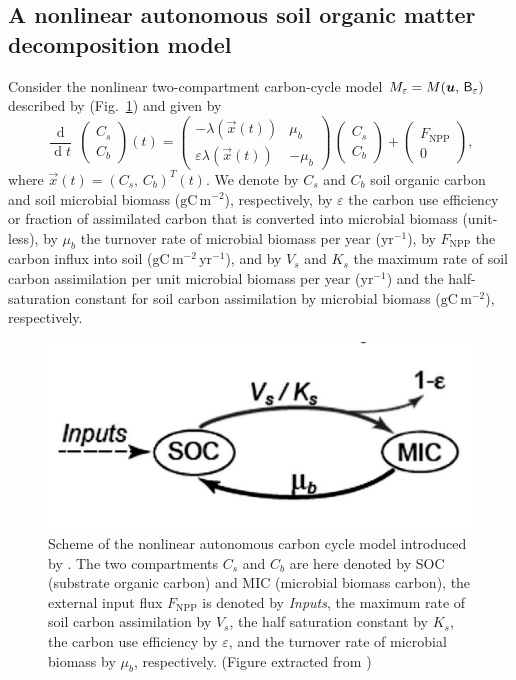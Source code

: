 \documentclass[smallextended]{svjour3}
\newcommand{\deriv}[1]{\frac{\operatorname{d}}{\operatorname{d}#1}}
\newcommand{\gC}{\mathrm{gC}}
\newcommand{\yr}{\mathrm{yr}}
\newcommand{\meter}{\mathrm{m}}
\newcommand{\transpose}{T}
\newcommand{\NPP}{\ensuremath{\mathrm{NPP}}}
\begin{document}
\subsection{A nonlinear autonomous soil organic matter decomposition model}
\label{sec:example_2}
Consider the nonlinear two-compartment carbon-cycle model $M_\varepsilon=M(\vec{u},\,\tens{B}_\varepsilon)$ described by \citet{Wang2014BG} (Fig.~\ref{fig:Wang_model}) and given by
\begin{equation*}
    \deriv{t}\,\begin{pmatrix}C_{s}\\C_{b}\end{pmatrix}(t) = 
    \begin{pmatrix}
      -\lambda(\vec{x}(t)) & \mu_{b}\\
      \varepsilon \lambda(\vec{x}(t)) & - \mu_{b}
    \end{pmatrix}
    \, \begin{pmatrix}C_{s}\\C_{b}\end{pmatrix}
    + \begin{pmatrix}F_{\NPP}\\0\end{pmatrix},
\end{equation*}
where $\vec{x}(t)=(C_{s},\,C_{b})^{\transpose}(t)$.
We denote by $C_s$ and $C_b$ soil organic carbon and soil microbial biomass ($\gC\,\meter^{-2}$), respectively, by $\varepsilon$ the carbon use efficiency or fraction of assimilated carbon that is converted into microbial biomass (unit-less), by $\mu_b$ the turnover rate of microbial biomass per year ($\yr^{-1}$), by $F_{\NPP}$ the carbon influx into soil ($\gC\,\meter^{-2}\,\yr^{-1}$), and by $V_s$ and $K_s$ the maximum rate of soil carbon assimilation per unit microbial biomass per year ($\yr^{-1}$) and the half-saturation constant for soil carbon assimilation by microbial biomass ($\gC\,\meter^{-2}$), respectively.

\begin{figure}[htbp]
    \centering
    \includegraphics[width=0.5\linewidth]{figs/Wang_model.png}
    \caption{Scheme of the nonlinear autonomous carbon cycle model introduced by \citet{Wang2014BG}. 
    The two compartments $C_s$ and $C_b$ are here denoted by SOC (substrate organic carbon) and MIC (microbial biomass carbon), the external input flux $F_{\NPP}$ is denoted by \emph{Inputs}, the maximum rate of soil carbon assimilation by $V_s$, the half saturation constant by $K_s$, the carbon use efficiency by $\varepsilon$, and the turnover rate of microbial biomass by $\mu_b$, respectively.
      (Figure extracted from \citet{Wang2014BG})}\label{fig:Wang_model}
\end{figure}
\end{document}
